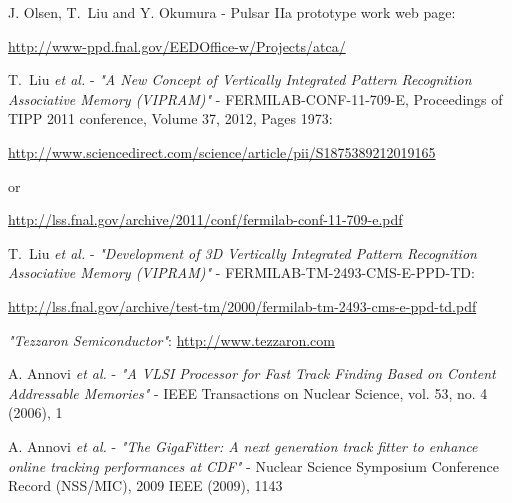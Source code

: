 \documentclass[10pt,a4paper]{article}
\begin{document}
\begin{thebibliography}{99}
 J. Olsen, T.~Liu and Y. Okumura - 
Pulsar IIa prototype work web page:

\url{http://www-ppd.fnal.gov/EEDOffice-w/Projects/atca/}

 T.~Liu {\it et al.} - {\it "A New Concept of Vertically Integrated Pattern Recognition Associative Memory (VIPRAM)"} - FERMILAB-CONF-11-709-E, Proceedings of TIPP 2011 conference, Volume 37, 2012, Pages 1973: 

\url{http://www.sciencedirect.com/science/article/pii/S1875389212019165}

or 

\url{http://lss.fnal.gov/archive/2011/conf/fermilab-conf-11-709-e.pdf}

 T.~Liu {\it et al.} - {\it "Development of 3D Vertically Integrated Pattern Recognition Associative Memory (VIPRAM)"} - FERMILAB-TM-2493-CMS-E-PPD-TD:

\url{http://lss.fnal.gov/archive/test-tm/2000/fermilab-tm-2493-cms-e-ppd-td.pdf}






 {\it "Tezzaron Semiconductor"}:
\url{http://www.tezzaron.com}







 A. Annovi {\it et al.} - {\it "A VLSI Processor for Fast Track Finding Based on Content Addressable Memories"} - IEEE Transactions on Nuclear Science, vol. 53, no. 4 (2006), 1

 A. Annovi {\it et al.} - {\it "The GigaFitter: A next generation track fitter to enhance online tracking performances at CDF"} - Nuclear Science Symposium Conference Record (NSS/MIC), 2009 IEEE (2009), 1143



\end{thebibliography}
\end{document}
